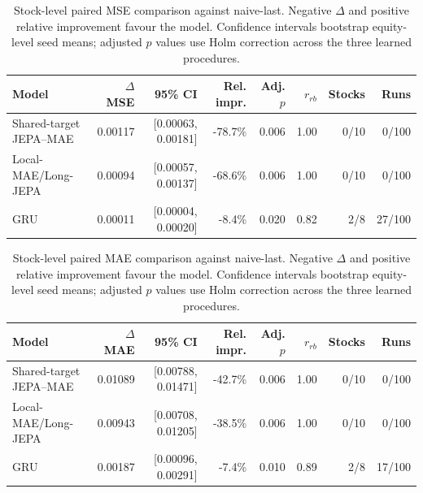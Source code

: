 \begin{table}[t]
\centering
\small
\caption{Stock-level paired MSE comparison against naive-last. Negative $\Delta$ and positive relative improvement favour the model. Confidence intervals bootstrap equity-level seed means; adjusted $p$ values use Holm correction across the three learned procedures.}
\label{tab:paired_mse_naive}
\begin{tabular}{lrrrrrrr}
\toprule
Model & $\Delta$MSE & 95\% CI & Rel. impr. & Adj. $p$ & $r_{rb}$ & Stocks & Runs \\
\midrule
Shared-target JEPA--MAE & 0.00117 & [0.00063, 0.00181] & -78.7\% & 0.006 & 1.00 & 0/10 & 0/100 \\
Local-MAE/Long-JEPA & 0.00094 & [0.00057, 0.00137] & -68.6\% & 0.006 & 1.00 & 0/10 & 0/100 \\
GRU & 0.00011 & [0.00004, 0.00020] & -8.4\% & 0.020 & 0.82 & 2/8 & 27/100 \\
\bottomrule
\end{tabular}
\end{table}

\begin{table}[t]
\centering
\small
\caption{Stock-level paired MAE comparison against naive-last. Negative $\Delta$ and positive relative improvement favour the model. Confidence intervals bootstrap equity-level seed means; adjusted $p$ values use Holm correction across the three learned procedures.}
\label{tab:paired_mae_naive}
\begin{tabular}{lrrrrrrr}
\toprule
Model & $\Delta$MAE & 95\% CI & Rel. impr. & Adj. $p$ & $r_{rb}$ & Stocks & Runs \\
\midrule
Shared-target JEPA--MAE & 0.01089 & [0.00788, 0.01471] & -42.7\% & 0.006 & 1.00 & 0/10 & 0/100 \\
Local-MAE/Long-JEPA & 0.00943 & [0.00708, 0.01205] & -38.5\% & 0.006 & 1.00 & 0/10 & 0/100 \\
GRU & 0.00187 & [0.00096, 0.00291] & -7.4\% & 0.010 & 0.89 & 2/8 & 17/100 \\
\bottomrule
\end{tabular}
\end{table}
